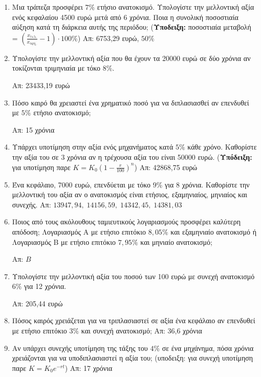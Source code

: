 \begin{enumerate}
  \item Μια τράπεζα προσφέρει $ 7\% $ ετήσιο ανατοκισμό. Υπολογίστε 
    την μελλοντική αξία ενός κεφαλαίου 4500 ευρώ μετά από 6 χρόνια. 
    Ποια η συνολική ποσοστιαία αύξηση κατά τη διάρκεια αυτής της 
    περιόδου; (\textbf{Υποδειξη:} ποσοστιαία μεταβολή = 
    $ (\frac{x_{\text{τελ.}}}{ x_{\text{αρχ.}}} - 1)\cdot 100\% $)
    \hfill Απ: 6753,29 ευρώ, $ 50\% $ 

  \item Υπολογίστε την μελλοντική αξία που θα έχουν τα 20000 ευρώ σε δύο 
    χρόνια αν τοκίζονται τριμηνιαία με τόκο $ 8\% $.

    \hfill Απ: 23433,19 ευρώ 


  \item Πόσο καιρό θα χρειαστεί ένα χρηματικό ποσό για να διπλασιασθεί αν 
    επενδυθεί με $ 5\% $ ετήσιο ανατοκισμό;

    \hfill Απ: 15 χρόνια 

  \item Υπάρχει υποτίμηση στην αξία ενός μηχανήματος κατά $ 5\% $ κάθε 
    χρόνο. Καθορίστε την αξία του σε 3 χρόνια αν η τρέχουσα αξία του
    είναι 50000 ευρώ.
    (\textbf{Υπόδειξη:} για υποτίμηση παρε $ K=K_{0}(1- \frac{r}{100})^{n} $)
    \hfill Απ: 42868,75 ευρώ 

  \item Ένα κεφάλαιο, 7000 ευρώ, επενδύεται με τόκο $ 9\% $ για 8 
    χρόνια. Καθορίστε την μελλοντική του αξία αν ο ανατοκισμός είναι
    ετήσιος, εξαμηνιαίος, μηνιαίος και συνεχής.
    \hfill Απ: $ 13947,94,\; 14156,59,\; 14342,45,\; 14381,03 $

  \item Ποιος από τους ακόλουθους ταμιευτικούς λογαριασμούς προσφέρει 
    καλύτερη απόδοση;
    Λογαριασμός Α με ετήσιο επιτόκιο $ 8,05\% $ και εξαμηνιαίο 
    ανατοκισμό ή Λογαριασμός Β με ετήσιο επιτόκιο $ 7,95\% $ και 
    μηνιαίο ανατοκισμό;

    \hfill Απ: $B$ 

  \item Υπολογίστε την μελλοντική αξία του ποσού των 100 ευρώ με 
    συνεχή ανατοκισμό $ 6\% $ για 12 χρόνια.

    \hfill Απ: 205,44 ευρώ 

  \item Πόσος καιρός χρειάζεται για να τριπλασιαστεί σε αξία ένα 
    κεφάλαιο αν επενδυθεί με ετήσιο επιτόκιο $ 3\% $ και συνεχή
    ανατοκισμό;
    \hfill Απ: 36,6 χρόνια 

  \item Αν υπάρχει συνεχής υποτίμηση της τάξης του $ 4\% $ σε ένα
    μηχάνημα, πόσα χρόνια χρειάζονται για να υποδιπλασιαστεί η αξία του;
    (υποδειξη: για συνεχή υποτίμηση παρε $ K=K_{0}e^{-rt} $)
    \hfill Απ: 17 χρόνια 



\end{enumerate}
